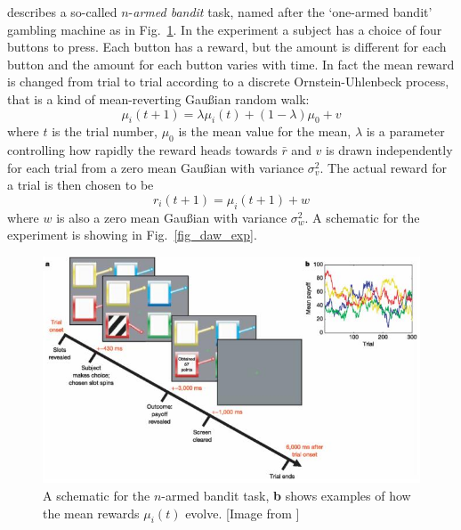 \documentclass[12pt]{article}
\begin{document}
\citet{DawEtAl2006} describes a so-called $n$-\textsl{armed bandit}
task, named after the \lq{}one-armed bandit\rq{} gambling machine as
in Fig.~\ref{fig_one_armed}. In the experiment a subject has a choice
of four buttons to press. Each button has a reward, but the amount is
different for each button and the amount for each button varies with
time. In fact the mean reward is changed from trial to trial according to a
discrete Ornstein-Uhlenbeck process, that is a kind of mean-reverting
Gau\ss{}ian random walk:
\begin{equation}
\mu_i(t+1)=\lambda \mu_i(t)+(1-\lambda)\mu_0+v
\end{equation}
where $t$ is the trial number, $\mu_0$ is the mean value for the mean, $\lambda$
is a parameter controlling how rapidly the reward heads towards
$\bar{r}$ and $v$ is drawn independently for each trial from a zero
mean Gau\ss{}ian with variance $\sigma_v^2$. The actual reward for a
trial is then chosen to be
\begin{equation}
r_i(t+1)=\mu_i(t+1)+w
\end{equation}
where $w$ is also a zero mean Gau\ss{}ian with variance $\sigma_w^2$.
A schematic for the experiment is showing in Fig.~\ref{fig_daw_exp}.

\begin{figure}[htb]
\begin{center}
\includegraphics[width=12cm]{fig_daw_exp.jpg}
\end{center}
\caption{A schematic for the $n$-armed bandit task, \textbf{b} shows examples of how the mean rewards $\mu_i(t)$  evolve. [Image from \citep{DawEtAl2006}]\label{fig_one_armed}}
\end{figure}
\end{document}
